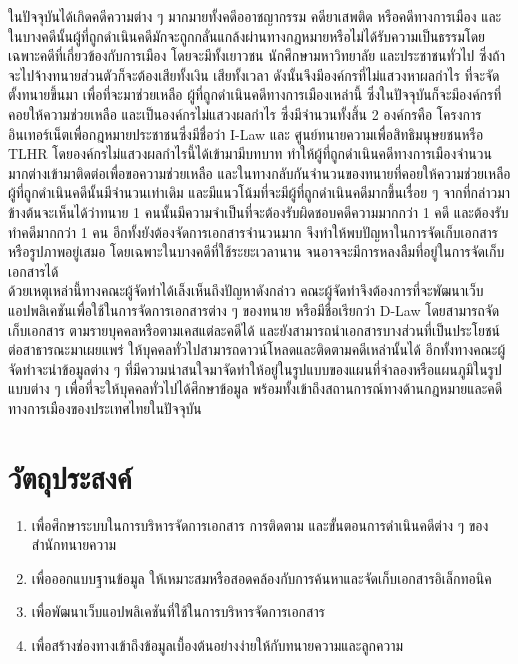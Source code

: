 \documentclass[12pt,oneside,openright,a4paper]{cpe-thai-project}
\begin{document}
\hspace*{1cm} ในปัจจุบันได้เกิดคดีความต่าง ๆ มากมายทั้งคดีออาชญากรรม คดียาเสพติด หรือคดีทางการเมือง และในบางคดีนั้นผู้ที่ถูกดำเนินคดีมักจะถูกกลั่นแกล้งผ่านทางกฎหมายหรือไม่ได้รับความเป็นธรรมโดยเฉพาะคดีที่เกี่ยวข้องกับการเมือง โดยจะมีทั้งเยาวชน นักศึกษามหาวิทยาลัย และประชาชนทั่วไป ซึ่งถ้าจะไปจ้างทนายส่วนตัวก็จะต้องเสียทั้งเงิน เสียทั้งเวลา ดังนั้นจึงมีองค์กรที่ไม่แสวงหาผลกำไร ที่จะจัดตั้งทนายขึ้นมา เพื่อที่จะมาช่วยเหลือ ผู้ที่ถูกดำเนินคดีทางการเมืองเหล่านี้ ซึ่งในปัจจุบันก็จะมีองค์กรที่คอยให้ความช่วยเหลือ และเป็นองค์กรไม่แสวงผลกำไร ซึ่งมีจำนวนทั้งสิ้น 2 องค์กรคือ โครงการอินเทอร์เน็ตเพื่อกฎหมายประชาชนซึ่งมีชื่อว่า I-Law และ ศูนย์ทนายความเพื่อสิทธิมนุษยชนหรือ TLHR โดยองค์กรไม่แสวงผลกำไรนี้ได้เข้ามามีบทบาท ทำให้ผู้ที่ถูกดำเนินคดีทางการเมืองจำนวนมากต่างเข้ามาติดต่อเพื่อขอความช่วยเหลือ และในทางกลับกันจำนวนของทนายที่คอยให้ความช่วยเหลือผู้ที่ถูกดำเนินคดีนั้นมีจำนวนเท่าเดิม และมีแนวโน้มที่จะมีผู้ที่ถูกดำเนินคดีมากขึ้นเรื่อย ๆ  จากที่กล่าวมาข้างต้นจะเห็นได้ว่าทนาย 1 คนนั้นมีความจำเป็นที่จะต้องรับผิดชอบคดีความมากกว่า 1 คดี และต้องรับทำคดีมากกว่า 1 คน อีกทั้งยังต้องจัดการเอกสารจำนวนมาก จึงทำให้พบปัญหาในการจัดเก็บเอกสาร หรือรูปภาพอยู่เสมอ โดยเฉพาะในบางคดีที่ใช้ระยะเวลานาน จนอาจจะมีการหลงลืมที่อยู่ในการจัดเก็บเอกสารได้ \\
\hspace*{1cm} ด้วยเหตุเหล่านี้ทางคณะผู้จัดทำได้เล็งเห็นถึงปัญหาดังกล่าว คณะผู้จัดทำจึงต้องการที่จะพัฒนาเว็บแอปพลิเคชันเพื่อใช้ในการจัดการเอกสารต่าง ๆ ของทนาย หรือมีชื่อเรียกว่า D-Law โดยสามารถจัดเก็บเอกสาร ตามรายบุคคลหรือตามเคสแต่ละคดีได้ และยังสามารถนำเอกสารบางส่วนที่เป็นประโยชน์ต่อสาธารณะมาเผยแพร่ ให้บุคคลทั่วไปสามารถดาวน์โหลดและติดตามคดีเหล่านั้นได้ อีกทั้งทางคณะผู้จัดทำจะนำข้อมูลต่าง ๆ ที่มีความน่าสนใจมาจัดทำให้อยู่ในรูปแบบของแผนที่จำลองหรือแผนภูมิในรูปแบบต่าง ๆ เพื่อที่จะให้บุคคลทั่วไปได้ศึกษาข้อมูล พร้อมทั้งเข้าถึงสถานการณ์ทางด้านกฎหมายและคดีทางการเมืองของประเทศไทยในปัจจุบัน

\section{วัตถุประสงค์}
\begin{enumerate}
  \item เพื่อศึกษาระบบในการบริหารจัดการเอกสาร การติดตาม และขั้นตอนการดำเนินคดีต่าง ๆ ของสำนักทนายความ
  \item เพื่อออกแบบฐานข้อมูล ให้เหมาะสมหรือสอดคล้องกับการค้นหาและจัดเก็บเอกสารอิเล็กทอนิค
  \item เพื่อพัฒนาเว็บแอปพลิเคชันที่ใช้ในการบริหารจัดการเอกสาร
  \item เพื่อสร้างช่องทางเข้าถึงข้อมูลเบื้องต้นอย่างง่ายให้กับทนายความและลูกความ
\end{enumerate}
\end{document}
